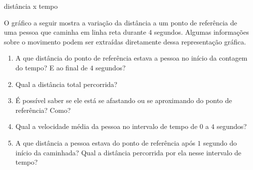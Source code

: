 \begin{task}{distância x tempo}
\label{ativ-dist-tempo}

O gráfico a seguir mostra a variação da distância a um ponto de referência de uma pessoa que caminha em linha reta durante \(4\) segundos. Algumas informações sobre o movimento podem ser extraídas diretamente dessa representação gráfica.
\label{\detokenize{AF107-4:fig-tempo-distancia}}
\begin{figure}[H]
\centering



\label{\detokenize{AF107-4:fig-tempo-distancia}}\end{figure}
\begin{enumerate}
\item {} 
A que distância do ponto de referência estava a pessoa no início da contagem do tempo? E ao final de \(4\) segundos?

\item {} 
Qual a distância total percorrida?

\item {} 
É possível saber se ele está se afastando ou se aproximando do ponto de referência? Como?

\item {} 
Qual a velocidade média da pessoa no intervalo de tempo de \(0\) a \(4\) segundos?

\item {} 
A que distância a pessoa estava do ponto de referência após \(1\) segundo do início da caminhada? Qual a distância percorrida por ela nesse intervalo de tempo?


\end{enumerate}
\end{task}
